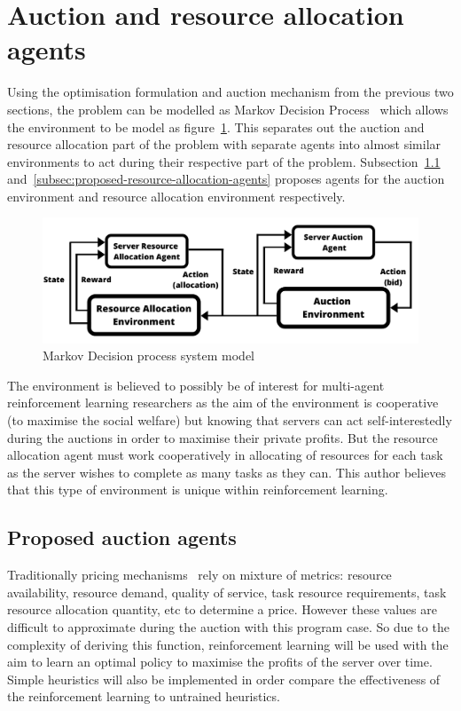 \section{Auction and resource allocation agents}\label{sec:proposed-agents}
Using the optimisation formulation and auction mechanism from the previous two sections, the problem can be modelled as
Markov Decision Process~\citep{Bel} which allows the environment to be model as figure~\ref{fig:mdp_system_model}.
This separates out the auction and resource allocation part of the problem with
separate agents into almost similar environments to act during their respective part of the problem.
Subsection~\ref{subsec:proposed-auction-agents} and~\ref{subsec:proposed-resource-allocation-agents} proposes agents
for the auction environment and resource allocation environment respectively.

\begin{figure}
    \centering
    \includegraphics[width=14cm]{figures/solution_fig/flexible_resource_allocation_env.pdf}
    \caption{Markov Decision process system model}
    \label{fig:mdp_system_model}
\end{figure}

The environment is believed to possibly be of interest for multi-agent reinforcement learning researchers as the aim
of the environment is cooperative (to maximise the social welfare) but knowing that servers can act self-interestedly
during the auctions in order to maximise their private profits. But the resource allocation agent must work
cooperatively in allocating of resources for each task as the server wishes to complete as many tasks as they can.
This author believes that this type of environment is unique within reinforcement learning.

\subsection{Proposed auction agents}\label{subsec:proposed-auction-agents}
Traditionally pricing mechanisms~\citep{al2013cloud} rely on mixture of metrics: resource availability, resource demand,
quality of service, task resource requirements, task resource allocation quantity, etc to determine a price. However
these values are difficult to approximate during the auction with this program case. So due to the complexity of
deriving this function, reinforcement learning will be used with the aim to learn an optimal policy to maximise the
profits of the server over time. Simple heuristics will also be implemented in order compare the effectiveness of the
reinforcement learning to untrained heuristics.

